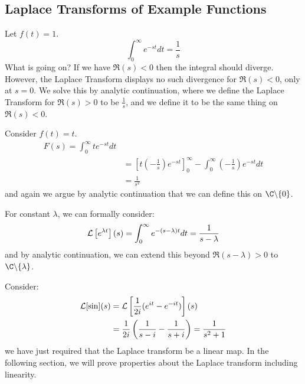 \documentclass[../Main.tex]{subfiles}
\begin{document}
\subsection{Laplace Transforms of Example Functions}
\begin{example}
    Let $f(t) = 1$.
    \begin{equation*}
        \int_{0}^{\infty} e^{-st} dt = \frac{1}{s}
    \end{equation*}
    What is going on? If we have $\Re(s) < 0$ then the integral should diverge. However, the Laplace Transform displays no such divergence for $\Re(s) < 0$, only at $s = 0$. We solve this by analytic continuation, where we define the Laplace Transform for $\Re(s) > 0$ to be $\frac1s$, and we define it to be the same thing on $\Re(s) < 0$.
\end{example}
\begin{example}
    Consider $f(t) = t$.
    \begin{align*}
        F(s) = \int_{0}^{\infty} te^{-st} dt \\
        &= \left[t \left(-\frac1s\right)e^{-st}\right]_0^\infty - \int_{0}^{\infty} \left(-\frac1s\right)e^{-st} dt \\
        &= \frac{1}{s^2}
    \end{align*}
    and again we argue by analytic continuation that we can define this on $\C \backslash \{0\}$.
\end{example}
\begin{example}[Exponentials]
    For constant $\lambda$, we can formally consider:
    \begin{equation*}
        \mathcal{L}\left[e^{\lambda t}\right](s) = \int_{0}^{\infty} e^{-(s - \lambda)t} dt = \frac{1}{s - \lambda}
    \end{equation*}
    and by analytic continuation, we can extend this beyond $\Re(s - \lambda) > 0$ to $\C \backslash \{\lambda\}$.
\end{example}
\begin{example}[Sine]
    Consider:
    \begin{align*}
        \mathcal{L}[\sin](s) &= \mathcal{L}\left[\frac1{2i} (e^{it} - e^{-it})\right](s) \\
        &= \frac{1}{2i} \left(\frac{1}{s-i} - \frac{1}{s+i}\right) = \frac{1}{s^2 + 1}
    \end{align*}
    we have just required that the Laplace transform be a linear map. In the following section, we will prove properties about the Laplace transform including linearity.
\end{example}
\end{document}
